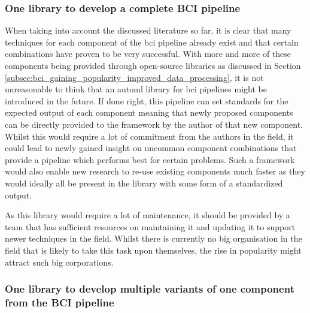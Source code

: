 
\subsubsection{One library to develop a complete BCI pipeline}
\label{subsubsec:bci_opportunities_obstacles_automl_one_library}

When taking into account the discussed literature so far, it is clear that many techniques for each component of the \gls{bci} pipeline already exist and that certain combinations have proven to be very successful.
With more and more of these components being provided through open-source libraries as discussed in Section \ref{subsec:bci_gaining_popularity_improved_data_processing}, it is not unreasonable to think that an \gls{automl} library for \gls{bci} pipelines might be introduced in the future.
If done right, this pipeline can set standards for the expected output of each component meaning that newly proposed components can be directly provided to the framework by the author of that new component.
Whilst this would require a lot of commitment from the authors in the field, it could lead to newly gained insight on uncommon component combinations that provide a pipeline which performs best for certain problems.
Such a framework would also enable new research to re-use existing components much faster as they would ideally all be present in the library with some form of a standardized output.

As this library would require a lot of maintenance, it should be provided by a team that has sufficient resources on maintaining it and updating it to support newer techniques in the field.
Whilst there is currently no big organisation in the field that is likely to take this task upon themselves, the rise in popularity might attract such big corporations.


\subsubsection{One library to develop multiple variants of one component from the BCI pipeline}
\label{subsubsec:bci_opportunities_obstacles_automl_one_component}

